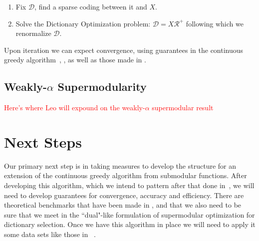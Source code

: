 \documentclass{article}
\begin{document}
\begin{enumerate}
\item Fix $\mathcal{D}$, find a sparse coding between it and $X$.
\item Solve the Dictionary Optimization problem: $\mathcal{D} = X\mathcal{R}^{+}$ following which we renormalize $\mathcal{D}$.
\end{enumerate}
Upon iteration we can expect convergence, using guarantees in the continuous greedy algorithm~\cite{greedy_selection}, \cite{submod_spectral}, \cite{submod_sparsecoding} as well as those made in \cite{BoutsidisLS15}.

\subsection{Weakly-$\alpha$ Supermodularity} \label{weakalpha}
\textcolor{red}{Here's where Leo will expound on the weakly-$\alpha$ supermodular result}

\section{Next Steps}
Our primary next step is in taking measures to develop the structure for an extension of the continuous greedy algorithm from submodular functions. After developing this algorithm, which we intend to pattern after that done in~\cite{Singer16TwoStage}, we will need to develop guarantees for convergence, accuracy and efficiency. There are theoretical benchmarks that have been made in \cite{greedy_selection}, \cite{Krause05near-optimalnonmyopic} and \cite{nonconvexrelax} that we also need to be sure that we meet in the ``dual"-like formulation of supermodular optimization for dictionary selection. Once we have this algorithm in place we will need to apply it some data sets like those in ~\cite{Singer16TwoStage}.



\end{document}

